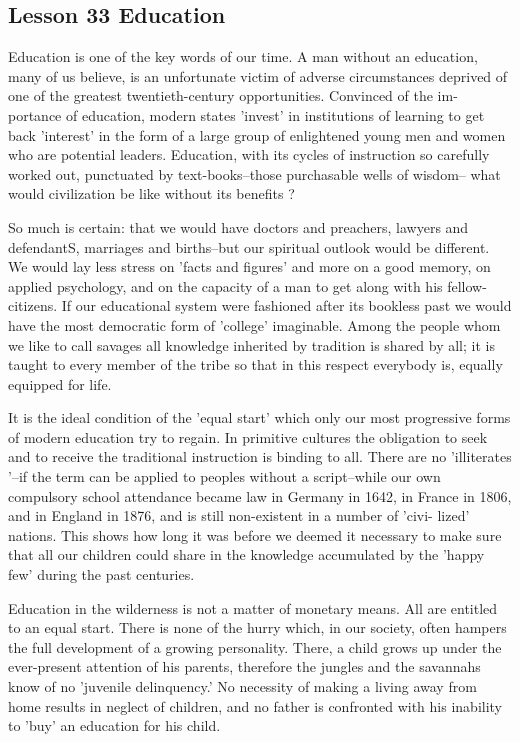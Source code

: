 \documentclass[kindlepaper]{BHCexam4kindle}
\begin{document}
\subsection{Lesson 33
Education}
\par
Education is one of the key words of our time. A man without an education,
many of us believe, is an unfortunate victim of adverse circumstances deprived
of one of the greatest twentieth-century opportunities. Convinced of the im-
portance of education, modern states 'invest' in institutions of learning to get
back 'interest' in the form of a large group of enlightened young men and women
who are potential leaders. Education, with its cycles of instruction so carefully
worked out, punctuated by text-books--those purchasable wells of wisdom--
what would civilization be like without its benefits ?
\par
So much is certain: that we would have doctors and preachers, lawyers and
defendantS, marriages and births--but our spiritual outlook would be different.
We would lay less stress on 'facts and figures' and more on a good memory, on
applied psychology, and on the capacity of a man to get along with his fellow-
citizens. If our educational system were fashioned after its bookless past we
would have the most democratic form of 'college' imaginable. Among the people
whom we like to call savages all knowledge inherited by tradition is shared by
all; it is taught to every member of the tribe so that in this respect everybody is,
equally equipped for life.
\par
It is the ideal condition of the 'equal start' which only our most progressive
forms of modern education try to regain. In primitive cultures the obligation to
seek and to receive the traditional instruction is binding to all. There are no
'illiterates '--if the term can be applied to peoples without a script--while our
own compulsory school attendance became law in Germany in 1642, in France
in 1806, and in England in 1876, and is still non-existent in a number of 'civi-
lized' nations. This shows how long it was before we deemed it necessary to
make sure that all our children could share in the knowledge accumulated by the
'happy few' during the past centuries.
\par
Education in the wilderness is not a matter of monetary means. All are entitled
to an equal start. There is none of the hurry which, in our society, often hampers
the full development of a growing personality. There, a child grows up under
the ever-present attention of his parents, therefore the jungles and the savannahs
know of no 'juvenile delinquency.' No necessity of making a living away from
home results in neglect of children, and no father is confronted with his inability
to 'buy' an education for his child.
\clearpage
\end{document}

